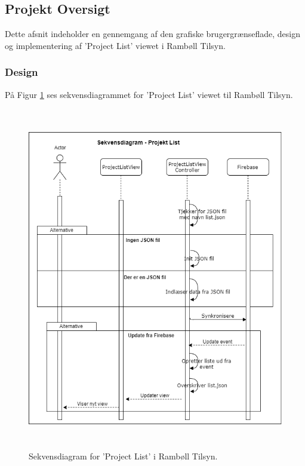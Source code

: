 \subsection{Projekt Oversigt} \label{sec:ProjectList}
Dette afsnit indeholder en gennemgang af den grafiske brugergrænseflade, design og implementering af 'Project List' viewet i Rambøll Tilsyn.

\subsubsection{Design}
På Figur \ref{fig:ProjctListSekvens} ses sekvensdiagrammet for 'Project List' viewet til Rambøll Tilsyn.
\begin{figure}[H] %
	\centering
	\includegraphics[height=15cm, width=15cm]{../ArkitekturDesign/Design/ProjectList/ProjektListSekvensDiagram}
	\caption{Sekvensdiagram for 'Project List' i Rambøll Tilsyn.}
	\label{fig:ProjctListSekvens}
\end{figure}

\clearpage

